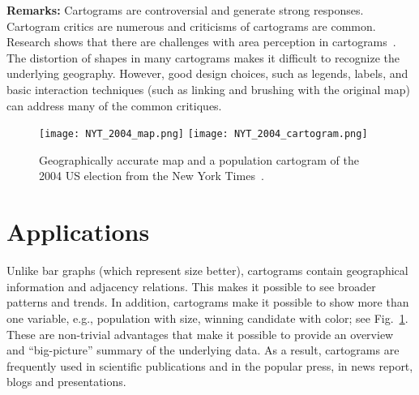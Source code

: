 \documentclass{egpubl}
\begin{document}
\begin{comment}
\noindent
\textbf{Modifiable Areal Unit Problem (MAUP):}
Statistical maps are prone to the modifiable areal unit problem (MAUP)~\cite{MAUP, MAUP_English_data} -- the scale at which one chooses to analyze and visualize information can produce different results. The obesity rate of the United States as whole is different from that of the state of California, which is different from that of Orange County, which is different from a specific neighborhood in Orange County. However, according to the research report by European Spatial Planning Observation Network, the effect of MAUP on cartograms can be reduced~\cite{ESPON_report}.
\end{comment}

\begin{comment}
\noindent
\textbf{Brightness vs. Visual area}

There could be fundamental flaws (such as encoding size with color progression or with difference in areas) or poor design that leads to misinterpretation of the data. For example, Steven's power law~\cite{Steven_law} indicates that length has better correlation with magnitude than area or color. 
The distortion of shapes in many cartograms (e.g., rectangular) make it hard to recognize the geography of locations. 
\end{comment}


\noindent
\textbf{Remarks:}
Cartograms are controversial and generate strong responses. Cartogram critics are numerous and criticisms of cartograms are common. Research shows that there are challenges with area perception in cartograms~\cite{dent1975}. The distortion of shapes in many cartograms makes it difficult to recognize the underlying geography. However, good design choices, such as legends, labels, and basic interaction techniques (such as linking and brushing with the original map) can address many of the common critiques.


\begin{figure}
{
\centering
\texttt{[image: NYT\_2004\_map.png]} 
\texttt{[image: NYT\_2004\_cartogram.png]}
\caption{Geographically accurate map and a population cartogram of the 2004 US election from the New York Times~\cite{NYT_04}.}
\label{fig:red-blue}
}
\end{figure}

\section{Applications}
\label{sec:application}
Unlike bar graphs (which represent size better), cartograms contain geographical information and adjacency relations. This makes it possible to see broader patterns and trends. In addition, cartograms make it possible to show more than one variable, e.g., population with size, winning candidate with color; see Fig.~\ref{fig:red-blue}. These are non-trivial advantages that make it possible to provide an overview and ``big-picture'' summary of the underlying data. As a result, cartograms are frequently used in scientific publications and in the popular press, in news report, blogs and presentations.
\end{document}
